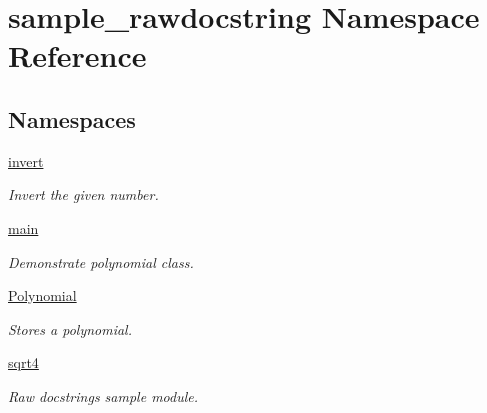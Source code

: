 \hypertarget{namespacesample__rawdocstring}{\section{sample\-\_\-rawdocstring Namespace Reference}
\label{namespacesample__rawdocstring}
}
\subsection*{Namespaces}
\begin{DoxyCompactItemize}
\item 
\hyperlink{namespacesample__rawdocstring_1_1invert}{invert}
\begin{DoxyCompactList}\small\item\em Invert the given number. \end{DoxyCompactList}\item 
\hyperlink{namespacesample__rawdocstring_1_1main}{main}
\begin{DoxyCompactList}\small\item\em Demonstrate polynomial class. \end{DoxyCompactList}\item 
\hyperlink{namespacesample__rawdocstring_1_1_polynomial}{Polynomial}
\begin{DoxyCompactList}\small\item\em Stores a polynomial. \end{DoxyCompactList}\item 
\hyperlink{namespacesample__rawdocstring_1_1sqrt4}{sqrt4}
\begin{DoxyCompactList}\small\item\em Raw docstrings sample module. \end{DoxyCompactList}\end{DoxyCompactItemize}
